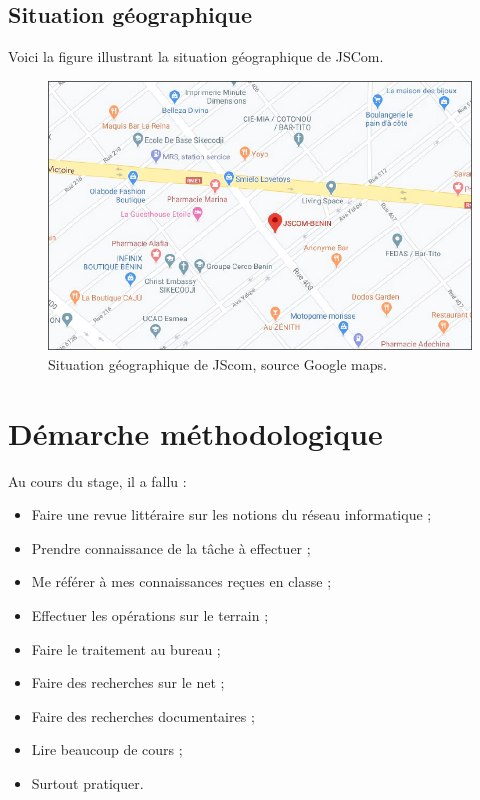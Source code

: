 \documentclass[a4paper,12pt,french]{report} %
\begin{document}
	\subsection{Situation géographique}
		Voici la figure illustrant la situation géographique de JSCom. 
	\begin{figure}[H]
	\centering
	\includegraphics[scale=0.8]{figure/jscom-map.png}		
	\caption{Situation géographique de JScom, source Google maps.}		
	\label{Situation géographique de JScom}
	\end{figure}
		
		
\section{Démarche méthodologique}
	Au cours du stage, il a fallu :
	\begin{itemize}
		\item Faire une revue littéraire sur les notions du réseau informatique ;
		\item Prendre connaissance de la tâche à effectuer ;
		\item Me référer à mes connaissances reçues en classe ;
		\item Effectuer les opérations sur le terrain ;
		\item Faire le traitement au bureau ;
		\item Faire des recherches sur le net  ;
		\item Faire des recherches documentaires ;
		\item Lire beaucoup de cours ;
		\item Surtout pratiquer.
	\end{itemize}
			
\end{document}
